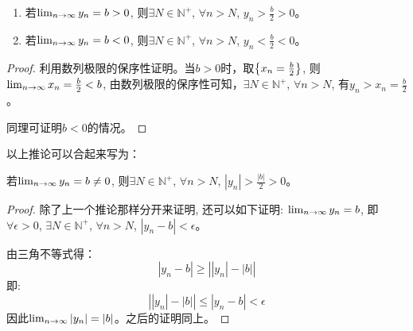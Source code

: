 \begin{lemma}
    \begin{enumerate}
        \item 若$\lim_{n \to \infty } y_n = b > 0$, 则$\exists N \in \mathbb{N}^+$, $\forall n > N$, $y_n > \frac{b}{2} > 0 $。
        \item 若$\lim_{n \to \infty } y_n = b < 0$, 则$\exists N \in \mathbb{N}^+$, $\forall n > N$, $y_n < \frac{b}{2} < 0 $。
    \end{enumerate}
\end{lemma}
\begin{proof}
    利用数列极限的保序性证明。当$b > 0$时，取$\left\{ x_n = \frac{b}{2}\right\}$, 则$\lim_{n \to \infty } x_n = \frac{b}{2} < b$, 由数列极限的保序性可知，$\exists N \in \mathbb{N}^+$, $\forall n > N$, 有$y_n > x_n = \frac{b}{2}$。 
    

    同理可证明$b < 0$的情况。
\end{proof}
以上推论可以合起来写为：
\begin{lemma}\label{lemma:progression-order-b}
    若$\lim_{n \to \infty } y_n = b \neq 0$, 则$\exists N \in \mathbb{N}^+$, $\forall n > N$, $\left| y_n \right|> \frac{\left| b \right|}{2} > 0 $。
\end{lemma}
\begin{proof}
    除了上一个推论那样分开来证明, 还可以如下证明:
    $\lim_{n \to \infty } y_n = b$, 即$\forall \epsilon > 0$, $\exists N \in \mathbb{N}^+$, $\forall n > N$, $\left| y_n - b\right| < \epsilon$。

    由三角不等式得：
    \begin{equation*}
        \left| y_n - b\right| \ge \left| \left| y_n \right| - \left| b \right| \right|
    \end{equation*}
    即:
    \begin{equation*}
        \left| \left| y_n \right| - \left| b \right| \right| \le \left| y_n - b\right| < \epsilon
    \end{equation*}
    因此$\lim_{n \to \infty } \left| y_n \right| = \left| b \right|$。之后的证明同上。
\end{proof}

